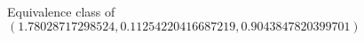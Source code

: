 \documentclass[preview]{standalone}
\begin{document}
\begin{center}
Equivalence class of $(1.78028717298524, 0.11254220416687219, 0.9043847820399701)$
\end{center}
\end{document}
